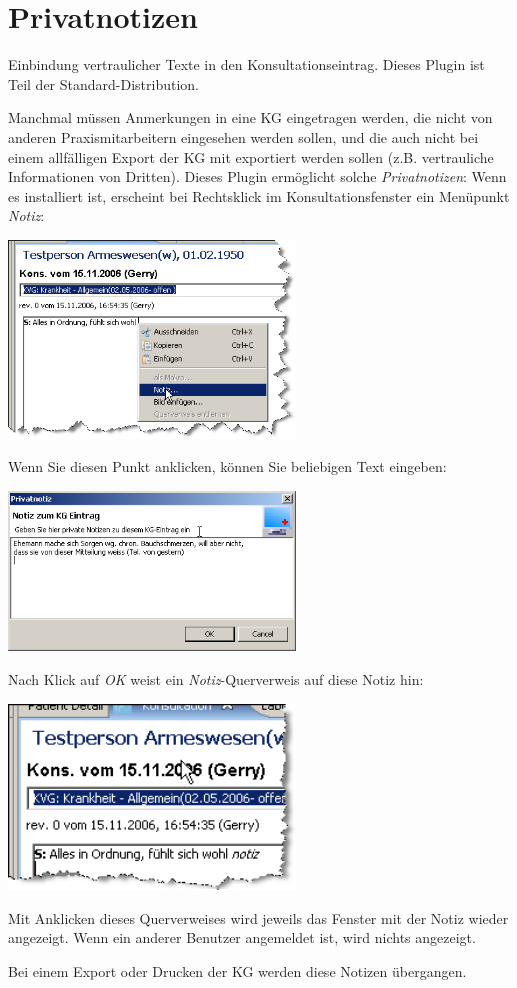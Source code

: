 
\section{Privatnotizen}\label{Privatnotizen}
Einbindung vertraulicher Texte in den Konsultationseintrag. Dieses Plugin ist Teil der Standard-Distribution.


Manchmal müssen Anmerkungen in eine KG eingetragen werden, die nicht von anderen Praxismitarbeitern eingesehen werden sollen, und die auch nicht bei einem allfälligen Export der KG mit exportiert werden sollen (z.B. vertrauliche Informationen von Dritten).
Dieses Plugin ermöglicht solche \textit{Privatnotizen}: Wenn es installiert ist, erscheint bei Rechtsklick im Konsultationsfenster ein Menüpunkt \textit{Notiz}:

\includegraphics[width=3in]{images/notiz1.png}

Wenn Sie diesen Punkt anklicken, können Sie beliebigen Text eingeben:

\includegraphics[width=3in]{images/notiz2.png}

Nach Klick auf \textit{OK} weist ein \textit{Notiz}-Querverweis auf diese Notiz hin:

\includegraphics[width=3in]{images/notiz3.png}

Mit Anklicken dieses Querverweises wird jeweils das Fenster mit der Notiz wieder angezeigt. Wenn ein anderer Benutzer angemeldet ist, wird nichts angezeigt.

Bei einem Export oder Drucken der KG werden diese Notizen übergangen.



